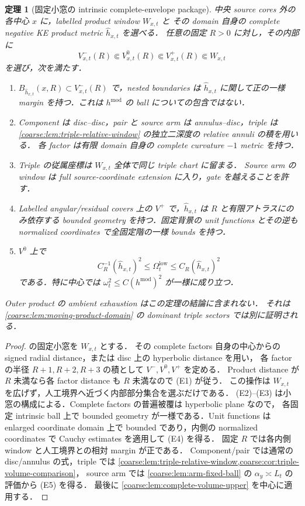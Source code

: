 \documentclass[a4paper,11pt]{ltjsarticle}
\numberwithin{equation}{section}
\theoremstyle{plain}
\newtheorem{theorem}{定理}[section]
\theoremstyle{definition}
\theoremstyle{remark}
\begin{document}
\begin{theorem}[固定小窓の intrinsic complete-envelope package]\label{coarse:thm:complete-envelope}
中央 source cores 外の各中心 $x$ に，labelled product window $W_{x,t}$ と
その domain 自身の complete negative KE product metric $\widehat h_{x,t}$ を選べる．
任意の固定 $R>0$ に対し，その内部に
\[
 V^-_{x,t}(R)\Subset V^0_{x,t}(R)\Subset V^+_{x,t}(R)\Subset W_{x,t}
\]
を選び，次を満たす．
\begin{enumerate}[label=\textup{(E\arabic*)}]
\item $B_{\widehat h_{x,t}}(x,R)\subset V^-_{x,t}(R)$ で，nested boundaries は
$\widehat h_{x,t}$ に関して正の一様 margin を持つ．これは $h^{\mathrm{mod}}$ の ball についての包含ではない．
\item Component は disc--disc，pair と source arm は annulus--disc，triple は
\cref{coarse:lem:triple-relative-window} の独立二深度の relative annuli の積を用いる．
各 factor は有限 domain 自身の complete curvature $-1$ metric を持つ．
\item Triple の従属座標は $W_{x,t}$ 全体で同じ triple chart に留まる．
Source arm の window は full source-coordinate extension に入り，gate を越えることを許す．
\item Labelled angular/residual covers 上の $V^+$ で，$\widehat h_{x,t}$ は
$R$ と有限アトラスにのみ依存する bounded geometry を持つ．固定背景の unit functions とその逆も
normalized coordinates で全固定階の一様 bounds を持つ．
\item $V^0$ 上で
\begin{equation}\label{coarse:eq:envelope-volume}
 C_R^{-1}(\widehat h_{x,t})^2\le\Omega_t^{\mathrm{low}}
 \le C_R(\widehat h_{x,t})^2
\end{equation}
である．特に中心では $\omega_t^2\le C(h^{\mathrm{mod}})^2$ が一様に成り立つ．
\end{enumerate}
Outer product の ambient exhaustion はこの定理の結論に含まれない．
それは \cref{coarse:lem:moving-product-domain} の dominant triple sectors では別に証明される．
\end{theorem}

\begin{proof}
 の固定小窓を $W_{x,t}$ とする．
その complete factors 自身の中心からの signed radial distance，または disc 上の hyperbolic distance を用い，
各 factor の半径 $R+1,R+2,R+3$ の積として $V^-,V^0,V^+$ を定める．
Product distance が $R$ 未満なら各 factor distance も $R$ 未満なので (E1) が従う．
この操作は $W_{x,t}$ を広げず，人工境界へ近づく内部部分集合を選ぶだけである．
(E2)--(E3) は小窓の構成による．Complete factors の普遍被覆は hyperbolic plane なので，
各固定 intrinsic ball 上で bounded geometry が一様である．Unit functions は enlarged coordinate domain 上で
bounded であり，内側の normalized coordinates で Cauchy estimates を適用して (E4) を得る．
固定 $R$ では各内側 window と人工境界との相対 margin が正である．
Component/pair では通常の disc/annulus の式，triple では
\cref{coarse:lem:triple-relative-window,coarse:cor:triple-volume-comparison}，
source arm では \cref{coarse:lem:arm-fixed-ball} の $\alpha_y\asymp L_t$ の評価から (E5) を得る．
最後に \cref{coarse:lem:complete-volume-upper} を中心に適用する．
\end{proof}
\end{document}
